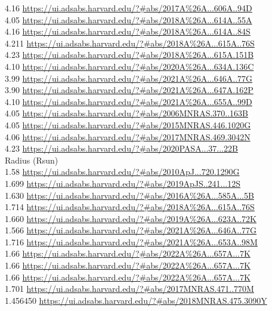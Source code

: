 4.16 \url{https://ui.adsabs.harvard.edu/?#abs/2017A%26A...606A..94D}\\
4.05 \url{https://ui.adsabs.harvard.edu/?#abs/2018A%26A...614A..55A}\\
4.16 \url{https://ui.adsabs.harvard.edu/?#abs/2018A%26A...614A..84S}\\
4.211 \url{https://ui.adsabs.harvard.edu/?#abs/2018A%26A...615A..76S}\\
4.23 \url{https://ui.adsabs.harvard.edu/?#abs/2018A%26A...615A.151B}\\
4.10 \url{https://ui.adsabs.harvard.edu/?#abs/2020A%26A...634A.136C}\\
3.99 \url{https://ui.adsabs.harvard.edu/?#abs/2021A%26A...646A..77G}\\
3.90 \url{https://ui.adsabs.harvard.edu/?#abs/2021A%26A...647A.162P}\\
4.10 \url{https://ui.adsabs.harvard.edu/?#abs/2021A%26A...655A..99D}\\
4.05 \url{https://ui.adsabs.harvard.edu/?#abs/2006MNRAS.370..163B}\\
4.05 \url{https://ui.adsabs.harvard.edu/?#abs/2015MNRAS.446.1020G}\\
4.06 \url{https://ui.adsabs.harvard.edu/?#abs/2017MNRAS.469.3042N}\\
4.23 \url{https://ui.adsabs.harvard.edu/?#abs/2020PASA...37...22B}\\

Radius (Rsun)\\
1.58 \url{https://ui.adsabs.harvard.edu/?#abs/2010ApJ...720.1290G}\\
1.699 \url{https://ui.adsabs.harvard.edu/?#abs/2019ApJS..241...12S}\\
1.630 \url{https://ui.adsabs.harvard.edu/?#abs/2016A%26A...585A...5B}\\
1.714 \url{https://ui.adsabs.harvard.edu/?#abs/2018A%26A...615A..76S}\\
1.660 \url{https://ui.adsabs.harvard.edu/?#abs/2019A%26A...623A..72K}\\
1.566 \url{https://ui.adsabs.harvard.edu/?#abs/2021A%26A...646A..77G}\\
1.716 \url{https://ui.adsabs.harvard.edu/?#abs/2021A%26A...653A..98M}\\
1.66 \url{https://ui.adsabs.harvard.edu/?#abs/2022A%26A...657A...7K}\\
1.66 \url{https://ui.adsabs.harvard.edu/?#abs/2022A%26A...657A...7K}\\
1.66 \url{https://ui.adsabs.harvard.edu/?#abs/2022A%26A...657A...7K}\\
1.701 \url{https://ui.adsabs.harvard.edu/?#abs/2017MNRAS.471..770M}\\
1.456450 \url{https://ui.adsabs.harvard.edu/?#abs/2018MNRAS.475.3090Y}\\


